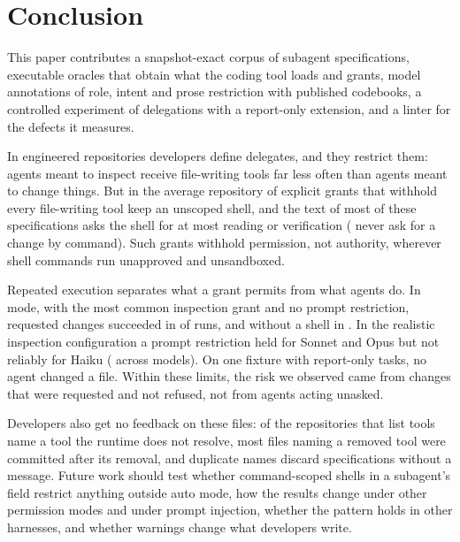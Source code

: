 \section{Conclusion}
\label{sec:conclusion}

This paper contributes a snapshot-exact corpus of \nSpecsAll{} subagent specifications, executable oracles that obtain
what the coding tool loads and grants, model annotations of role, intent and prose restriction with published
codebooks, a controlled experiment of \nExpRuns{} delegations with a report-only extension, and a linter for the
defects it measures.

In \nReposEng{} engineered repositories developers define \nSpecsEng{} delegates, and they restrict them: agents meant
to inspect receive file-writing tools far less often than agents meant to change things. But in the average
repository \RQthreeIncoherentEng{} of explicit grants that withhold every file-writing tool keep an unscoped shell, and
the text of most of these specifications asks the shell for at most reading or verification (\ShellUseNoChangeNeed{}
never ask for a change by command). Such grants withhold permission, not authority, wherever shell commands run
unapproved and unsandboxed.

Repeated execution separates what a grant permits from what agents do. In  mode, with the most common
inspection grant and no prompt restriction, requested changes succeeded in \ExpCtwoRate{} of runs, and without a shell
in \ExpCfourRate{}. In the realistic inspection configuration a prompt restriction held for Sonnet and Opus but not
reliably for Haiku (\ExpCthreeRange{} across models). On one fixture with report-only tasks, no agent changed a file.
Within these limits, the risk we observed came from changes that were requested and not refused, not from agents
acting unasked.

Developers also get no feedback on these files: \RQsixUnresolvedRepos{} of the repositories that list tools name a tool the runtime
does not resolve, most files naming a removed tool were committed after its removal, and duplicate names discard
\RQsixShadowed{} specifications without a message. Future work should test whether command-scoped shells in a subagent's 
field restrict anything outside auto mode, how the results change under other permission modes and under prompt injection, whether the pattern
holds in other harnesses, and whether warnings change what developers write.
